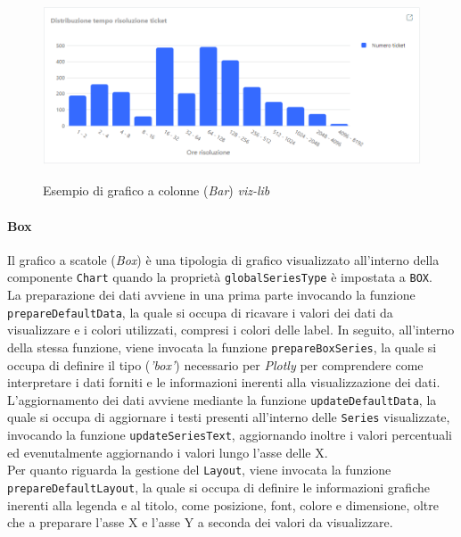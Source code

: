\begin{figure}[H]
    \centering
    \includegraphics[alt={Esempio di grafico a colonne viz-lib}, width=1 \columnwidth, height=\maxdimen, keepaspectratio]{img/ex_bar.png}
    \caption{Esempio di grafico a colonne (\textit{Bar}) \textit{viz-lib}}
    \label{fig:bar-example}
\end{figure}

\paragraph{Box}
Il grafico a scatole (\textit{Box}) è una tipologia di grafico visualizzato all'interno della componente \texttt{Chart} quando la proprietà \texttt{globalSeriesType} è impostata a \texttt{BOX}. \\
La preparazione dei dati avviene in una prima parte invocando la funzione \\
\texttt{prepareDefaultData}, la quale si occupa di ricavare i valori dei dati da visualizzare e i colori utilizzati, compresi i
colori delle label. In seguito, all'interno della stessa funzione, viene invocata la funzione \texttt{prepareBoxSeries}, la quale si occupa di definire il tipo (\textit{'box'}) necessario per \textit{Plotly} per comprendere
come interpretare i dati forniti e le informazioni inerenti alla visualizzazione dei dati. \\
L'aggiornamento dei dati avviene mediante la funzione \texttt{updateDefaultData}, la quale si occupa di aggiornare i testi presenti all'interno delle \texttt{Series} visualizzate, invocando la funzione
\texttt{updateSeriesText}, aggiornando inoltre i valori percentuali ed evenutalmente aggiornando i valori lungo l'asse delle X. \\
Per quanto riguarda la gestione del \texttt{Layout}, viene invocata la funzione \\
\texttt{prepareDefaultLayout}, la quale si occupa di definire le informazioni grafiche inerenti alla legenda e al titolo, come posizione,
font, colore e dimensione, oltre che a preparare l'asse X e l'asse Y a seconda dei valori da visualizzare.

